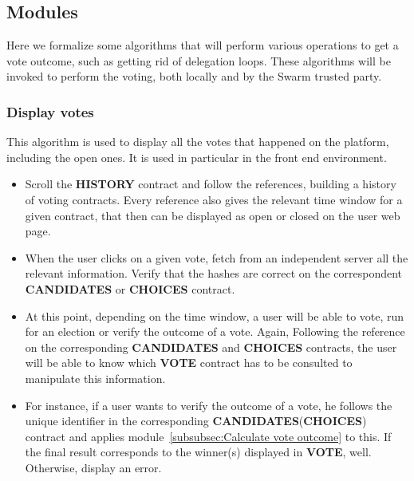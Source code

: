 \documentclass[submission, copyright,creativecommons,sharealike,noncommercial]{eptcs}
\newcommand{\Candidates}{\textbf{CANDIDATES}\xspace}
\newcommand{\Choices}{\textbf{CHOICES}\xspace}
\newcommand{\Vote}{\textbf{VOTE}\xspace}
\newcommand{\History}{\textbf{HISTORY}\xspace}
\begin{document}
\subsection{Modules}\label{subsec:Modules}
%	
	Here we formalize some algorithms that will perform various operations to get a vote outcome, such as getting rid of delegation loops. These algorithms will be invoked to perform the voting, both locally and by the Swarm trusted party.
	
\subsubsection{Display votes}\label{subsubsec:Display votes}
	This algorithm is used to display all the votes that happened on the platform, including the open ones. It is used in particular in the front end environment.
	\begin{itemize}
		\item Scroll the \History contract and follow the references, building a history of voting contracts. Every reference also gives the relevant time window for a given contract, that then can be displayed as open or closed on the user web page.
		
		\item When the user clicks on a given vote, fetch from an independent server all the relevant information. Verify that the hashes are correct on the correspondent \Candidates or \Choices contract.
		
		\item At this point, depending on the time window, a user will be able to vote, run for an election or verify the outcome of a vote. Again, Following the reference on the corresponding \Candidates and \Choices contracts, the user will be able to know which \Vote contract has to be consulted to manipulate this information.
		
		\item For instance, if a user wants to verify the outcome of a vote, he follows the unique identifier in the corresponding \Candidates (\Choices) contract and applies module~\ref{subsubsec:Calculate vote outcome} to this. If the final result corresponds to the winner(s) displayed in \Vote, well. Otherwise, display an error.
	\end{itemize}
\end{document}
